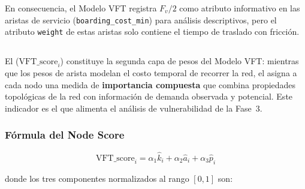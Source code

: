 En consecuencia, el Modelo VFT registra $F_v / 2$ como atributo informativo en
las aristas de servicio (\texttt{boarding\_cost\_min}) para análisis
descriptivos, pero el atributo \texttt{weight} de estas aristas solo contiene el
tiempo de traslado con fricción.

\subsection{}
\label{subsec:node-score}


El  ($\text{VFT\_score}_i$) constituye la segunda capa de
pesos del Modelo VFT: mientras que los pesos de arista modelan el costo temporal
de recorrer la red, el  asigna a cada nodo una medida de
\textbf{importancia compuesta} que combina propiedades topológicas de la red con
información de demanda observada y potencial. Este indicador es el que alimenta
el análisis de vulnerabilidad de la Fase~3.

\subsubsection{Fórmula del Node Score}
\label{subsubsec:formula-vft-score}

\begin{equation}
    \text{VFT\_score}_i = \alpha_1 \hat{k}_i + \alpha_2 \hat{a}_i + \alpha_3 \hat{p}_i
    \label{eq:vft-score}
\end{equation}

donde los tres componentes normalizados al rango $[0, 1]$ son:

